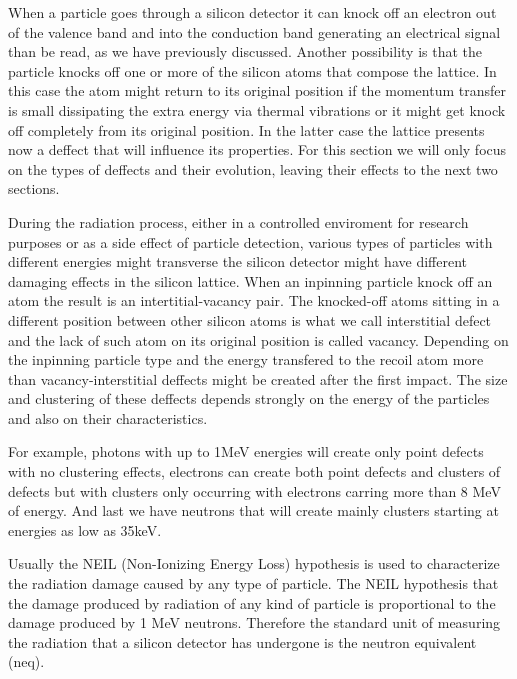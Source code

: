 When a particle goes through a silicon detector it can knock off an electron out of the valence band and into the conduction band generating an electrical signal than be read, as we have previously discussed. Another possibility is that the particle knocks off one or more of the silicon atoms that compose the lattice. In this case the atom might return to its original position if the momentum transfer is small dissipating the extra energy via thermal vibrations or it might get knock off completely from its original position. In the latter case the lattice presents now a deffect that will influence its properties. For this section we will only focus on the types of deffects and their evolution, leaving their effects to the next two sections. 

During the radiation process, either in a controlled enviroment for research purposes or as a side effect of particle detection, various types of particles with different energies might transverse the silicon detector might have different damaging effects in the silicon lattice. When an inpinning particle knock off an atom the result is an intertitial-vacancy pair. The knocked-off atoms sitting in a different position between other silicon atoms is what we call interstitial defect and the lack of such atom on its original position is called vacancy. Depending on the inpinning particle type and the energy transfered to the recoil atom more than vacancy-interstitial deffects might be created after the first impact. The size and clustering of these deffects depends strongly on the energy of the particles and also on their characteristics. 

For example, photons with up to 1MeV energies will create only point defects with no clustering effects, electrons can create both point defects and clusters of defects but with clusters only occurring with electrons carring more than 8 MeV of energy. And last we have neutrons that will create mainly clusters starting at energies as low as 35keV. 

Usually the NEIL (Non-Ionizing Energy Loss) hypothesis is used to characterize the radiation damage caused by any type of particle. The NEIL hypothesis that the damage produced by radiation of any kind of particle is proportional to the damage produced by 1 MeV neutrons. Therefore the standard unit of measuring the radiation that a silicon detector has undergone is the neutron equivalent (neq).

